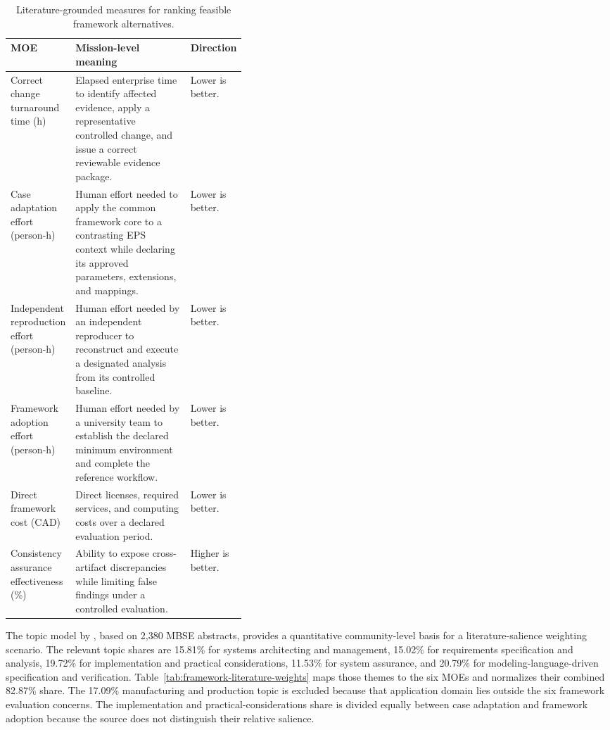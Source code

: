 \documentclass[11pt,a4paper]{article}
\begin{document}
\begin{table}[H]
    \centering
    \small
    \caption{Literature-grounded measures for ranking feasible framework alternatives.}
    \label{tab:framework-moes}
    \begin{tabularx}{\linewidth}{>{\raggedright\arraybackslash}p{0.25\linewidth} X >{\raggedright\arraybackslash}p{0.14\linewidth}}
        \toprule
        \textbf{MOE} & \textbf{Mission-level meaning} & \textbf{Direction} \\
        \midrule
        Correct change turnaround time (h) & Elapsed enterprise time to identify affected evidence, apply a representative controlled change, and issue a correct reviewable evidence package. & Lower is better. \\
        Case adaptation effort (person-h) & Human effort needed to apply the common framework core to a contrasting EPS context while declaring its approved parameters, extensions, and mappings. & Lower is better. \\
        Independent reproduction effort (person-h) & Human effort needed by an independent reproducer to reconstruct and execute a designated analysis from its controlled baseline. & Lower is better. \\
        Framework adoption effort (person-h) & Human effort needed by a university team to establish the declared minimum environment and complete the reference workflow. & Lower is better. \\
        Direct framework cost (CAD) & Direct licenses, required services, and computing costs over a declared evaluation period. & Lower is better. \\
        Consistency assurance effectiveness (\%) & Ability to expose cross-artifact discrepancies while limiting false findings under a controlled evaluation. & Higher is better. \\
        \bottomrule
    \end{tabularx}
\end{table}

The topic model by \citet[Table~4]{akundi2022textmining}, based on 2,380 MBSE abstracts, provides a quantitative community-level basis for a literature-salience weighting scenario. The relevant topic shares are 15.81\% for systems architecting and management, 15.02\% for requirements specification and analysis, 19.72\% for implementation and practical considerations, 11.53\% for system assurance, and 20.79\% for modeling-language-driven specification and verification. Table~\ref{tab:framework-literature-weights} maps those themes to the six MOEs and normalizes their combined 82.87\% share. The 17.09\% manufacturing and production topic is excluded because that application domain lies outside the six framework evaluation concerns. The implementation and practical-considerations share is divided equally between case adaptation and framework adoption because the source does not distinguish their relative salience.
\end{document}
